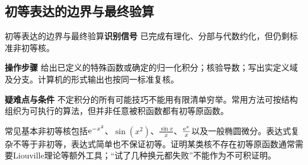 \subsection{初等表达的边界与最终验算}\label{ic:indefinite_special_complete:boundary}\begin{method}{初等表达的边界与最终验算}\textbf{识别信号} 已完成有理化、分部与代数约化，但仍剩标准非初等核。\par \textbf{操作步骤} 给出已定义的特殊函数或确定的归一化积分；核验导数；写出实定义域及分支。计算机的形式输出也按同一标准复核。\par \textbf{疑难点与条件} 不定积分的所有可能技巧不能用有限清单穷举。常用方法可按结构组织为可执行的算法，但并非任意被积函数都有初等原函数。\end{method}

\begin{warning}常见基本非初等核包括$\mathrm{e}^{-x^2}$、$\sin(x^2)$、$\frac{\sin x}{x}$、$\frac{\mathrm{e}^x}{x}$以及一般椭圆微分。表达式复杂不等于非初等，表达式简单也不保证初等。证明某类核不存在初等原函数通常需要Liouville理论等额外工具；“试了几种换元都失败”不能作为不可积证明。\end{warning}

